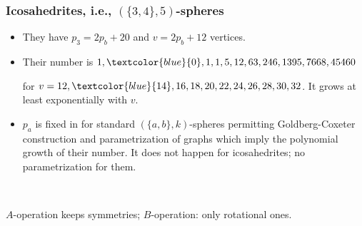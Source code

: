 \documentclass{beamer}
\begin{document}
\begin{frame}\frametitle{Icosahedrites, i.e.,  $(\{3,4\},5)$-spheres}
\vspace{-3mm}\begin{itemize}
\item They have $p_3=2p_b+20$ and $v=2p_b+12$ vertices.

\item Their number is 
$1,\textcolor{blue}{0},1,1,5,12,63,246,1395,7668,45460$  

for $v=12,\textcolor{blue}{14},16,18,20,22,24,26,28,30,32$. 
It grows at least exponentially with $v$. 


\item $p_a$ is fixed in 
for standard $(\{a,b\},k)$-spheres 
permitting
Goldberg-Coxeter construction and parametrization of graphs which 
imply the polynomial growth of their number.
It  does not happen for icosahedrites; no  parametrization for them.
\end{itemize}
\vspace{-3mm}
\begin{center}
\begin{minipage}[b]{20mm}
\centering
{}\par
\end{minipage}
$\,\,\,\,\,\,\,\,\,\,\,\,\,\,\,\,\,\,\,\,\,\,\,\,\,\,\,\,\,\,\,\,\,\,\,\,\,\,\,\,\,\,$
\begin{minipage}[b]{20mm}
\centering
{}\par
\end{minipage}
\end{center}
$A$-operation keeps symmetries; $B$-operation: only rotational ones.
\end{frame}
\end{document}
